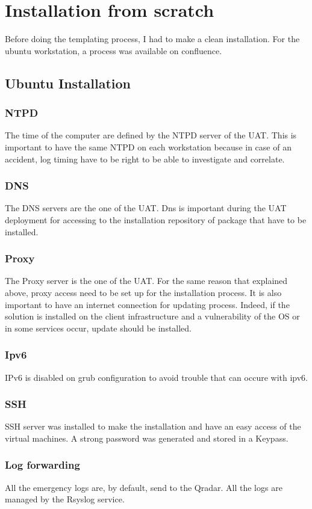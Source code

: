 \documentclass{tnreport}
\begin{document}
\section{Installation from scratch}
Before doing the templating process, I had to make a clean installation. For the ubuntu workstation, a process was available on confluence. 
\subsection{Ubuntu Installation}
\subsubsection{NTPD}
The time of the computer are defined by the NTPD server of the \gls{UAT}. This is important to have the same NTPD on each workstation because in case of an accident, log timing have to be right to be able to investigate and correlate.
\subsubsection{DNS}
The DNS servers are the one of the \gls{UAT}. Dns is important during the \gls{UAT} deployment for accessing to the installation repository of package that have to be installed.
\subsubsection{Proxy}
The Proxy server is the one of the \gls{UAT}. For the same reason that explained above, proxy access need to be set up for the installation process. It is also important to have an internet connection for updating process. Indeed, if the solution is installed on the client infrastructure and a vulnerability of the OS or in some services occur, update should be installed.
\subsubsection{Ipv6}
IPv6 is disabled on grub configuration to avoid trouble that can occure with ipv6.
\subsubsection{SSH}
SSH server was installed to make the installation and have an easy access of the virtual machines. A strong password was generated and stored in a Keypass.
\subsubsection{Log forwarding}
All the emergency logs are, by default, send to the Qradar. All the logs are managed by the Rsyslog service.
\end{document}
